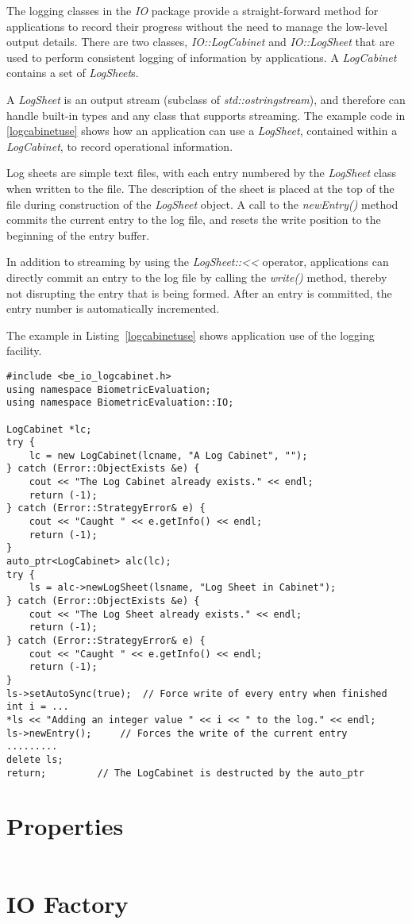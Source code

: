 The logging classes in the {\em IO} package provide a straight-forward method
for applications to record their progress without the need to manage the
low-level output details.
There are two classes, {\em IO::LogCabinet} and {\em IO::LogSheet} that are used
to perform consistent logging of information by applications. A {\em LogCabinet}
contains a set of {\em LogSheet}s.

A {\em LogSheet} is an output stream (subclass of {\em std::ostringstream}),
and therefore can handle built-in types and any class that supports streaming.
The example code in \ref{logcabinetuse} shows how an application can use a
{\em LogSheet}, contained within a {\em LogCabinet}, to record operational
information.

Log sheets are simple text files, with each entry numbered by the {\em LogSheet}
class when written to the file. The description of the sheet is placed at the
top of the file during construction of the {\em LogSheet} object. A call to the
{\em newEntry()} method commits the current entry to the log file, and resets
the write position to the beginning of the entry buffer.

In addition to streaming by using the {\em LogSheet::<<} operator, applications
can directly commit an entry to the log file by calling the {\em write()}
method, thereby not disrupting the entry that is being formed. After an entry
is committed, the entry number is automatically incremented.

The example in Listing~\ref{logcabinetuse} shows application use of the
logging facility.

\lstset{language=c++}
\begin{lstlisting}[caption={Using a LogSheet within a LogCabinet}, label=logcabinetuse]
#include <be_io_logcabinet.h>
using namespace BiometricEvaluation;
using namespace BiometricEvaluation::IO;

LogCabinet *lc;
try {
    lc = new LogCabinet(lcname, "A Log Cabinet", "");
} catch (Error::ObjectExists &e) {
    cout << "The Log Cabinet already exists." << endl;
    return (-1);
} catch (Error::StrategyError& e) {
    cout << "Caught " << e.getInfo() << endl;
    return (-1);
}
auto_ptr<LogCabinet> alc(lc);
try {
    ls = alc->newLogSheet(lsname, "Log Sheet in Cabinet");
} catch (Error::ObjectExists &e) {
    cout << "The Log Sheet already exists." << endl;
    return (-1);
} catch (Error::StrategyError& e) {
    cout << "Caught " << e.getInfo() << endl;
    return (-1);
}
ls->setAutoSync(true);	// Force write of every entry when finished
int i = ...
*ls << "Adding an integer value " << i << " to the log." << endl;
ls->newEntry();		// Forces the write of the current entry
.........
delete ls;
return;			// The LogCabinet is destructed by the auto_ptr
\end{lstlisting}

\section{Properties}
\label{sec-properties}

\lstset{language=c++}
\begin{lstlisting}[caption={Using a Properties Object}, label=propertiesuse]
\end{lstlisting}

\section{IO Factory}
\label{sec-iofactory}
